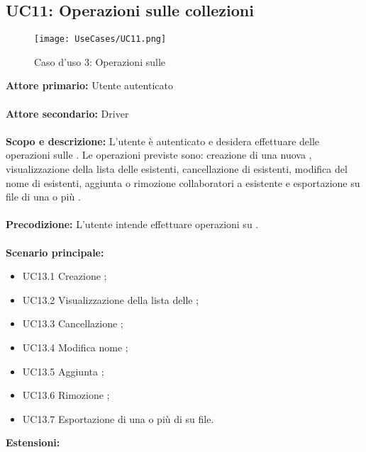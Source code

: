 \documentclass{scalatekids-article}
\begin{document}
\subsection{UC11: Operazioni sulle collezioni}

\begin{figure}[H]
  \begin{center}
    \texttt{[image: UseCases/UC11.png]}
    \caption*{Caso d'uso 3: Operazioni sulle }
  \end{center}
\end{figure}
\textbf{Attore primario:} Utente autenticato\\ \\
\textbf{Attore secondario:} Driver\\ \\
\textbf{Scopo e descrizione:} L'utente è autenticato e desidera effettuare delle operazioni sulle . Le operazioni previste sono:
creazione di una nuova , visualizzazione della lista delle  esistenti, cancellazione di  esistenti, modifica del nome di  esistenti,
aggiunta o rimozione collaboratori a  esistente e esportazione su file di una o più .\\ \\
\textbf{Precodizione:} L'utente intende effettuare operazioni su .\\ \\
\textbf{Scenario principale:}
\begin{itemize}
\item UC13.1 Creazione ;
\item UC13.2 Visualizzazione della lista delle ;
\item UC13.3 Cancellazione ;
\item UC13.4 Modifica nome ;
\item UC13.5 Aggiunta ;
\item UC13.6 Rimozione ;
\item UC13.7 Esportazione di una o più di  su file.
\end{itemize}
\textbf{Estensioni:}
\end{document}
